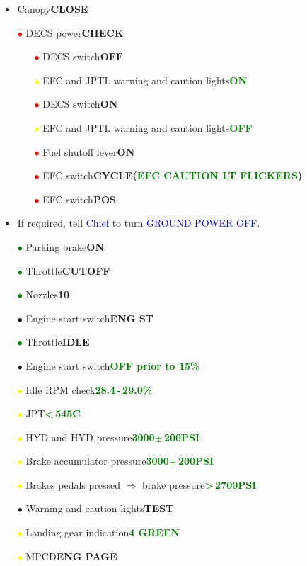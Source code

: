 \documentclass[a4paper,12pt,dvipsnames]{letter}
\newcommand{\radio}[1]{\textcolor{blue}{#1}}
\newcommand{\button}[1]{\textbf{#1}}
\newcommand{\degC}{\textdegree{}C}
\newcommand{\Deg}{\textdegree{}}
\newcommand{\ok}[1]{\textcolor{Green}{\textbf{#1}}}
\newcommand{\bi}{\textcolor{ProcessBlue}{$\bullet$\;}}
\newcommand{\ri}{\textcolor{red}{$\bullet$\;}}
\newcommand{\gi}{\textcolor{Green}{$\bullet$\;}}
\newcommand{\yi}{\textcolor{Yellow}{$\bullet$\;}}
\begin{document}
{\begin{itemize}
\item Canopy\dotfill\button{CLOSE}
\item[\ri] DECS power\dotfill\button{CHECK}
\begin{itemize}
 \item[\ri] DECS switch\dotfill\button{OFF}
 \item[\yi] EFC and JPTL warning and caution lights\dotfill\ok{ON}
 \item[\ri] DECS switch\dotfill\button{ON}
 \item[\yi] EFC and JPTL warning and caution lights\dotfill\ok{OFF}
 \item[\ri] Fuel shutoff lever\dotfill\button{ON}
 \item[\ri] EFC switch\dotfill\button{CYCLE\;(\ok{EFC CAUTION LT FLICKERS})}
 \item[\ri] EFC switch\dotfill\button{POS}
\end{itemize}
\item If required, tell \radio{Chief} to turn \radio{GROUND POWER OFF}.
\item[\gi] Parking brake\dotfill\button{ON}
\item[\gi] Throttle\dotfill\button{CUTOFF}
\item[\gi] Nozzles\dotfill\button{10\Deg}
\item[\bi] Engine start switch\dotfill\button{ENG ST}
\item[\gi] Throttle\dotfill\button{IDLE}
\item[\bi] Engine start switch\dotfill\ok{OFF prior to 15\%}
\item[\yi] Idle RPM check\dotfill\ok{28.4\,-\,29.0\%}
\item[\yi] JPT\dotfill\ok{<\,545\degC}
\item[\yi] HYD and HYD pressure\dotfill\ok{3000\;$\pm$\,200\;PSI}
\item[\yi] Brake accumulator pressure\dotfill\ok{3000\;$\pm$\,200\;PSI}
\item[\yi] Brakes pedals pressed $\Rightarrow$ brake pressure\dotfill\ok{>\,2700\;PSI}
\item[\bi] Warning and caution lights\dotfill\button{TEST}
\item[\yi] Landing gear indication\dotfill\ok{4 GREEN}
\item[\yi] MPCD\dotfill\button{ENG PAGE}

\end{itemize}}
\end{document}
